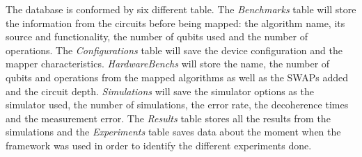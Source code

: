 \begin{itemize}
The database is conformed by six different table.
The \emph{Benchmarks} table will store the information from the circuits before being mapped: the algorithm name, its source and functionality, the number of qubits used and the number of operations.
The \emph{Configurations} table will save the device configuration and the mapper characteristics.
\emph{HardwareBenchs} will store the name, the number of qubits and operations from the mapped algorithms as well as the SWAPs added and the circuit depth.
\emph{Simulations} will save the simulator options as the simulator used, the number of simulations, the error rate, the decoherence times and the measurement error.
The \emph{Results} table stores all the results from the simulations and the \emph{Experiments} table saves data about the moment when the framework was used in order to identify the different experiments done.
\end{itemize}
